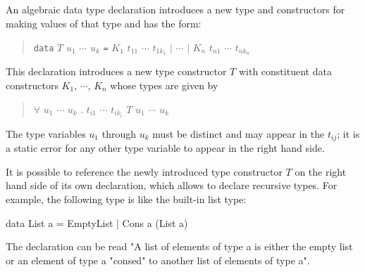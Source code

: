 \begin{flushleft}
     \sym{=}  \\
 \\
  \opt{\sym{!}}  
  \alt\  \opt{\sym{!}}  \bracea{} \bracez{}\\
 \\
\end{flushleft}

An algebraic data type declaration introduces a new type and constructors for making values of that type and has the form:
\begin{quote}
\texttt{data} $T$ $u_1$ $\cdots$ $u_k$ \texttt{=} $K_1$ $t_{11}$ $\cdots$ $t_{1k_1}$ $|$ $\cdots$ $|$ $K_n$ $t_{n1}$ $\cdots$ $t_{nk_n}$
\end{quote}

This declaration introduces a new type constructor $T$ with constituent data constructors $K_1$, $\cdots$, $K_n$ whose types are given by
\begin{quote}
$\forall$ $u_1$ $\cdots$ $u_k$ . $t_{i1}$ \arrow{} $\cdots$ \arrow{} $t_{ik_i}$ \arrow{} $T$ $u_1$ $\cdots$ $u_k$
\end{quote}

The type variables $u_1$ through $u_k$ must be distinct and may appear in the $t_{ij}$; it is a static error for any other type variable to appear in the right hand side.

It is possible to reference the newly introduced type constructor $T$ on the right hand side of its own declaration, which allows to declare recursive types. For example, the following type is like the built-in list type:

\begin{code}
data List a = EmptyList | Cons a (List a)
\end{code}

The declaration can be read "A list of elements of type a is either the empty list or an element of type a "consed" to another list of elements of type a".

